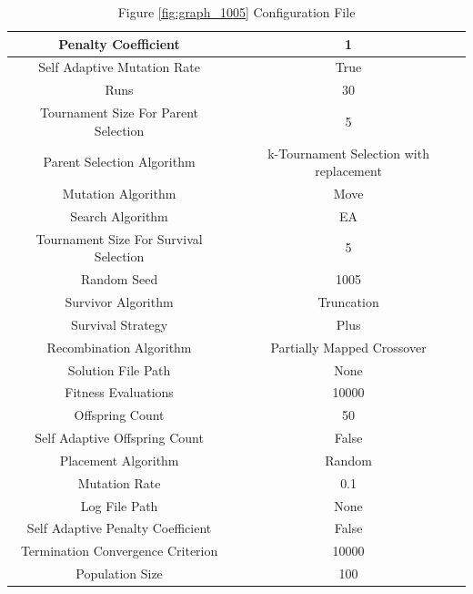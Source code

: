 \documentclass{standalone}
\begin{document}
\begin{table}[!htb]
	\centering
	\caption{Figure \ref{fig:graph_1005} Configuration File}
	\label{tab:graph_1005}
	\begin{tabular}{| c | c |}
		\hline
		Penalty Coefficient		& 1		 \\
		\hline
		Self Adaptive Mutation Rate		& True		 \\
		\hline
		Runs		& 30		 \\
		\hline
		Tournament Size For Parent Selection		& 5		 \\
		\hline
		Parent Selection Algorithm		& k-Tournament Selection with replacement		 \\
		\hline
		Mutation Algorithm		& Move		 \\
		\hline
		Search Algorithm		& EA		 \\
		\hline
		Tournament Size For Survival Selection		& 5		 \\
		\hline
		Random Seed		& 1005		 \\
		\hline
		Survivor Algorithm		& Truncation		 \\
		\hline
		Survival Strategy		& Plus		 \\
		\hline
		Recombination Algorithm		& Partially Mapped Crossover		 \\
		\hline
		Solution File Path		& None		 \\
		\hline
		Fitness Evaluations		& 10000		 \\
		\hline
		Offspring Count		& 50		 \\
		\hline
		Self Adaptive Offspring Count		& False		 \\
		\hline
		Placement Algorithm		& Random		 \\
		\hline
		Mutation Rate		& 0.1		 \\
		\hline
		Log File Path		& None		 \\
		\hline
		Self Adaptive Penalty Coefficient		& False		 \\
		\hline
		Termination Convergence Criterion		& 10000		 \\
		\hline
		Population Size		& 100		 \\
		\hline
	\end{tabular}
\end{table}
\end{document}
